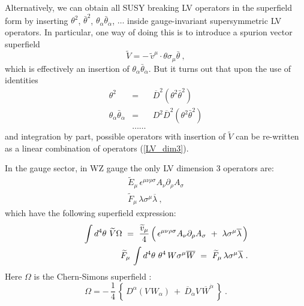 \documentclass[paper,12pt]{revtex4}
\begin{document}
	Alternatively, we can obtain 
	all SUSY breaking LV operators in the superfield form by
	inserting  $ \theta^2 $, 
	$ \bar{\theta}^2 $, 
	$ \theta_\alpha \bar{\theta}_{\dot\alpha} $, 
	$ \dots $ inside
	gauge-invariant supersymmetric LV operators.
	In particular, one way of doing this 
\cite{GrootNibbelink:2004za}
	is to introduce a spurion vector superfield
\[
	\widetilde{V} = -\, \widetilde{v}^\mu \cdot 
	\theta \sigma_\mu \bar{\theta}~,
\]
	which is effectively an insertion of 	
	$ \theta_\alpha \bar{\theta}_{\dot\alpha} $.
	But it turns out that upon the use of identities
\begin{eqnarray*}
	\theta^2 & = & \overline{D}^2 ( \theta^2 \bar{\theta}^2 ) \\
	\theta_\alpha \bar{\theta}_{\dot\alpha} & = &
		D^2 \overline{D}^2 ( \theta^2 \bar{\theta}^2 ) \\
	         & \ldots\ldots &
\end{eqnarray*}
and integration by part, possible operators with insertion of $\widetilde V$ can 
be re-written as a linear combination 
 of operators (\ref{LV_dim3}).
	
	In the gauge sector, in WZ gauge the only LV dimension 3 
	operators are:
\begin{eqnarray}
\nonumber
	& 
	\widetilde{E}_\mu\, \epsilon^{\mu\nu\rho\sigma}
		A_\nu \partial_\rho A_\sigma  &\\
\nonumber
	&
	\widetilde{F}_\mu\, \lambda \sigma^\mu \overline{\lambda} 
	~, &
\end{eqnarray}
	which have the following superfield expression:
\begin{eqnarray*}
\label{CSint}
	&&
	\phantom{\widetilde{F}_\mu\,}
	\int d^4\theta~ \widetilde{V} \Omega 
	~ = ~
	   \frac{\widetilde{v}_\mu}{4}\,
	\Bigl(\, 
		\epsilon^{\mu\nu\rho\sigma}
		A_\nu \partial_\rho A_\sigma
		~+~
		\lambda \sigma^\mu \overline{\lambda}
	        \,
	\Bigr) \\
	&&
	\widetilde{F}_\mu\, \int d^4\theta~ \theta^4\, 
		W \sigma^\mu \overline{W} 
	~ = ~
	\widetilde{F}_\mu\, \lambda \sigma^\mu \overline{\lambda}~.
\end{eqnarray*}
	Here $ \Omega $ is the Chern-Simons superfield
\cite{Cecotti:1987nw}:
\[
	\Omega = -\, \frac{1}{4}\,
		\left\{\, 
			D^\alpha (V\, W_\alpha) 
			~+~
			\overline{D}_{\dot\alpha}V\,
				\overline{W}^{\dot\alpha}
			\,
		\right\}~.
\]
	
\end{document}
